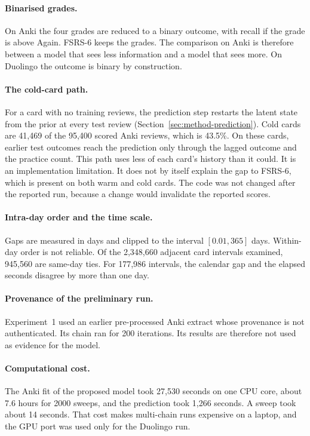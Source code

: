 \paragraph{Binarised grades.}
On Anki the four grades are reduced to a binary outcome, with recall if the grade is above Again. FSRS-6 keeps the
grades. The comparison on Anki is therefore between a model that sees less information and a model that sees more. On
Duolingo the outcome is binary by construction.

\paragraph{The cold-card path.}
For a card with no training reviews, the prediction step restarts the latent state from the prior at every test review
(Section~\ref{sec:method-prediction}). Cold cards are 41,469 of the 95,400 scored Anki reviews, which is 43.5\%. On these
cards, earlier test outcomes reach the prediction only through the lagged outcome and the practice count. This path uses
less of each card's history than it could. It is an implementation limitation. It does not by itself explain the gap to
FSRS-6, which is present on both warm and cold cards. The code was not changed after the reported run, because a change
would invalidate the reported scores.

\paragraph{Intra-day order and the time scale.}
Gaps are measured in days and clipped to the interval $[0.01, 365]$ days. Within-day order is not reliable. Of the
2,348,660 adjacent card intervals examined, 945,560 are same-day ties. For 177,986 intervals, the calendar gap and the
elapsed seconds disagree by more than one day.

\paragraph{Provenance of the preliminary run.}
Experiment~1 used an earlier pre-processed Anki extract whose provenance is not authenticated. Its chain ran for 200
iterations. Its results are therefore not used as evidence for the model.

\paragraph{Computational cost.}
The Anki fit of the proposed model took 27,530 seconds on one CPU core, about 7.6 hours for 2000 sweeps, and the prediction
took 1,266 seconds. A sweep took about 14 seconds. That cost makes multi-chain runs expensive on a laptop, and the
GPU port was used only for the Duolingo run.

